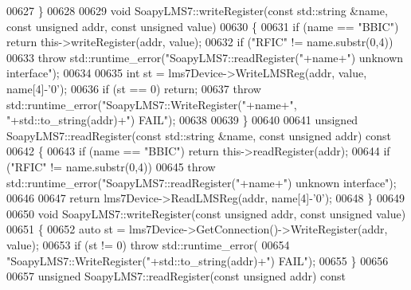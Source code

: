 \begin{DoxyCode}
{{{{{{{{{{{{{{00627 \}
00628 
00629 \textcolor{keywordtype}{void} SoapyLMS7::writeRegister(\textcolor{keyword}{const} std::string &name, \textcolor{keyword}{const} \textcolor{keywordtype}{unsigned} addr, \textcolor{keyword}{const} \textcolor{keywordtype}{unsigned} value)
00630 \{
00631     \textcolor{keywordflow}{if} (name == \textcolor{stringliteral}{"BBIC"}) \textcolor{keywordflow}{return} this->writeRegister(addr, value);
00632     \textcolor{keywordflow}{if} (\textcolor{stringliteral}{"RFIC"} != name.substr(0,4))  
00633         \textcolor{keywordflow}{throw} std::runtime\_error(\textcolor{stringliteral}{"SoapyLMS7::readRegister("}+name+\textcolor{stringliteral}{") unknown interface"});
00634 
00635     \textcolor{keywordtype}{int} st = lms7Device->WriteLMSReg(addr, value, name[4]-\textcolor{charliteral}{'0'});
00636     \textcolor{keywordflow}{if} (st == 0) \textcolor{keywordflow}{return};
00637     \textcolor{keywordflow}{throw} std::runtime\_error(\textcolor{stringliteral}{"SoapyLMS7::WriteRegister("}+name+\textcolor{stringliteral}{", "}+std::to\_string(addr)+\textcolor{stringliteral}{") FAIL"});
00638 
00639 \}
00640 
00641 \textcolor{keywordtype}{unsigned} SoapyLMS7::readRegister(\textcolor{keyword}{const} std::string &name, \textcolor{keyword}{const} \textcolor{keywordtype}{unsigned} addr)\textcolor{keyword}{ const}
00642 \textcolor{keyword}{}\{
00643     \textcolor{keywordflow}{if} (name == \textcolor{stringliteral}{"BBIC"}) \textcolor{keywordflow}{return} this->readRegister(addr);
00644     \textcolor{keywordflow}{if} (\textcolor{stringliteral}{"RFIC"} != name.substr(0,4))  
00645         \textcolor{keywordflow}{throw} std::runtime\_error(\textcolor{stringliteral}{"SoapyLMS7::readRegister("}+name+\textcolor{stringliteral}{") unknown interface"});
00646     
00647     \textcolor{keywordflow}{return} lms7Device->ReadLMSReg(addr, name[4]-\textcolor{charliteral}{'0'});
00648 \}
00649 
00650 \textcolor{keywordtype}{void} SoapyLMS7::writeRegister(\textcolor{keyword}{const} \textcolor{keywordtype}{unsigned} addr, \textcolor{keyword}{const} \textcolor{keywordtype}{unsigned} value)
00651 \{
00652     \textcolor{keyword}{auto} st = lms7Device->GetConnection()->WriteRegister(addr, value);
00653     \textcolor{keywordflow}{if} (st != 0) \textcolor{keywordflow}{throw} std::runtime\_error(
00654         \textcolor{stringliteral}{"SoapyLMS7::WriteRegister("}+std::to\_string(addr)+\textcolor{stringliteral}{") FAIL"});
00655 \}
00656 
00657 \textcolor{keywordtype}{unsigned} SoapyLMS7::readRegister(\textcolor{keyword}{const} \textcolor{keywordtype}{unsigned} addr)\textcolor{keyword}{ const}
}}}}}}}}}}}}}}
\end{DoxyCode}
